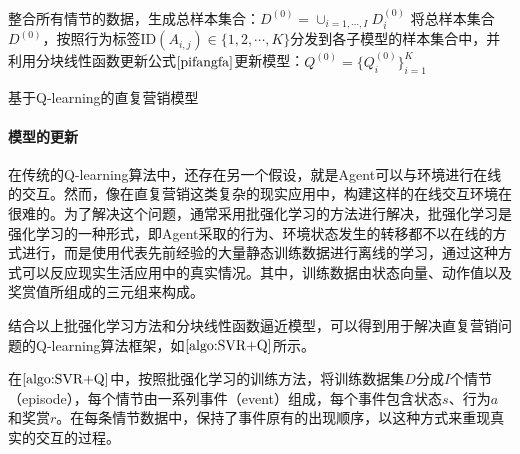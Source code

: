 \begin{algorithm}[htbp]
\small
\SetAlgoLined
{} 

整合所有情节的数据，生成总样本集合：$D^{(0)}=\cup_{i=1,\cdots,I} D_{i}^{(0)}$\;
将总样本集合$D^{(0)}$，按照行为标签ID$(A_{i,j}) \in \{1,2,\cdots, K \}$分发到各子模型的样本集合中，并利用分块线性函数更新公式$\eqref{pifangfa}$更新模型：$Q^{(0)}=\{Q_{i}^{(0)}\}_{i=1}^{K}$\;
\caption{基于Q-learning的直复营销模型}
\label{algo:SVR+Q}
\end{algorithm}

\paragraph{模型的更新}
在传统的Q-learning算法中，还存在另一个假设，就是Agent可以与环境进行在线的交互。然而，像在直复营销这类复杂的现实应用中，构建这样的在线交互环境在很难的。为了解决这个问题，通常采用批强化学习\citep{lange2012batch}的方法进行解决，批强化学习是强化学习的一种形式，即Agent采取的行为、环境状态发生的转移都不以在线的方式进行，而是使用代表先前经验的大量静态训练数据进行离线的学习，通过这种方式可以反应现实生活应用中的真实情况。其中，训练数据由状态向量、动作值以及奖赏值所组成的三元组来构成。

结合以上批强化学习方法和分块线性函数逼近模型，可以得到用于解决直复营销问题的Q-learning算法框架，如$\ref{algo:SVR+Q}$所示。

在$\ref{algo:SVR+Q}$中，按照批强化学习的训练方法，将训练数据集$D$分成$I$个情节（episode），每个情节由一系列事件（event）组成，每个事件包含状态$s$、行为$a$和奖赏$r$。在每条情节数据中，保持了事件原有的出现顺序，以这种方式来重现真实的交互的过程。

